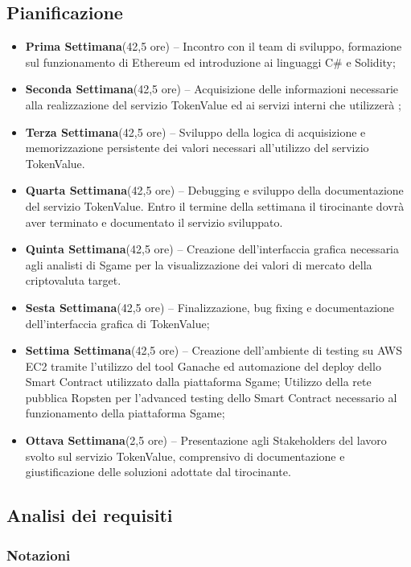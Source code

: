 \documentclass[11pt]{thesistemp}
\begin{document}
\subsection{Pianificazione}

\begin{itemize}
	\item \textbf{Prima Settimana}(42,5 ore) – Incontro con il team di sviluppo, formazione sul funzionamento di Ethereum ed introduzione ai linguaggi C\# e Solidity;
	\item \textbf{Seconda Settimana}(42,5 ore) – Acquisizione delle informazioni necessarie alla realizzazione del servizio TokenValue ed ai servizi interni che utilizzerà ;
	\item \textbf{Terza Settimana}(42,5 ore) – Sviluppo della logica di acquisizione e memorizzazione persistente dei valori necessari all’utilizzo del servizio TokenValue.
	\item \textbf{Quarta Settimana}(42,5 ore) – Debugging e sviluppo della documentazione del servizio TokenValue. Entro il termine della settimana il tirocinante dovrà aver terminato e documentato il servizio sviluppato.
	\item \textbf{Quinta Settimana}(42,5 ore) – Creazione dell’interfaccia grafica necessaria agli analisti di Sgame per la visualizzazione dei valori di mercato della criptovaluta target.
	\item \textbf{Sesta Settimana}(42,5 ore) – Finalizzazione, bug fixing e documentazione dell’interfaccia grafica di TokenValue;
	\item \textbf{Settima Settimana}(42,5 ore) – Creazione dell’ambiente di testing su AWS EC2 tramite l’utilizzo del tool Ganache ed automazione del deploy dello Smart Contract utilizzato dalla piattaforma Sgame; Utilizzo della rete pubblica Ropsten per l'advanced testing dello Smart Contract necessario al funzionamento della piattaforma Sgame;
	\item \textbf{Ottava Settimana}(2,5 ore) – Presentazione agli Stakeholders del lavoro svolto sul servizio TokenValue, comprensivo di documentazione e giustificazione delle soluzioni adottate dal tirocinante.
\end{itemize}
\pagebreak

\subsection{Analisi dei requisiti}

\subsubsection{Notazioni}
\end{document}
